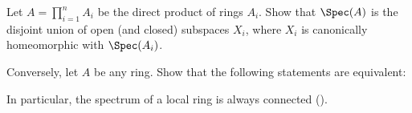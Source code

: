 \begin{exercise}
Let \(A = \prod_{i=1}^n A_i\) be the direct product of rings \(A_i\).
Show that \(\Spec(A)\) is the disjoint union of open (and closed) subspaces \(X_i\), where \(X_i\) is canonically homeomorphic with \(\Spec(A_i)\).

Conversely, let \(A\) be any ring.
Show that the following statements are equivalent:

In particular, the spectrum of a local ring is always connected ().
\end{exercise}

